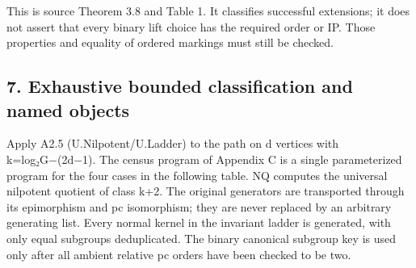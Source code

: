 \documentclass[
  11pt,
  a4paper,
]{article}
\begin{document}
This is source Theorem 3.8 and Table 1. It classifies successful
extensions; it does not assert that every binary lift choice has the
required order or IP. Those properties and equality of ordered markings
must still be checked.

\subsection{7. Exhaustive bounded classification and named
objects}\label{exhaustive-bounded-classification-and-named-objects}

Apply A2.5 (U.Nilpotent/U.Ladder) to the path on d vertices with
k=log₂\textbar G\textbar−(2d−1). The census program of Appendix C is a
single parameterized program for the four cases in the following table.
NQ computes the universal nilpotent quotient of class k+2. The original
generators are transported through its epimorphism and pc isomorphism;
they are never replaced by an arbitrary generating list. Every normal
kernel in the invariant ladder is generated, with only equal subgroups
deduplicated. The binary canonical subgroup key is used only after all
ambient relative pc orders have been checked to be two.
\end{document}

